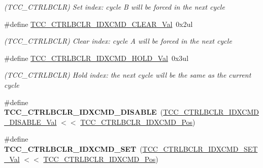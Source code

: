 \begin{DoxyCompactItemize}
\begin{DoxyCompactList}\small\item\em (T\+C\+C\+\_\+\+C\+T\+R\+L\+B\+C\+L\+R) Set index\+: cycle B will be forced in the next cycle \end{DoxyCompactList}\item 
\hypertarget{group___s_a_m_l21___t_c_c_ga330fda675ed566f5e7ccca52c33df413}{}\#define \hyperlink{group___s_a_m_l21___t_c_c_ga330fda675ed566f5e7ccca52c33df413}{T\+C\+C\+\_\+\+C\+T\+R\+L\+B\+C\+L\+R\+\_\+\+I\+D\+X\+C\+M\+D\+\_\+\+C\+L\+E\+A\+R\+\_\+\+Val}~0x2ul\label{group___s_a_m_l21___t_c_c_ga330fda675ed566f5e7ccca52c33df413}

\begin{DoxyCompactList}\small\item\em (T\+C\+C\+\_\+\+C\+T\+R\+L\+B\+C\+L\+R) Clear index\+: cycle A will be forced in the next cycle \end{DoxyCompactList}\item 
\hypertarget{group___s_a_m_l21___t_c_c_gad32be7d01dd69980f7da94c6353064f9}{}\#define \hyperlink{group___s_a_m_l21___t_c_c_gad32be7d01dd69980f7da94c6353064f9}{T\+C\+C\+\_\+\+C\+T\+R\+L\+B\+C\+L\+R\+\_\+\+I\+D\+X\+C\+M\+D\+\_\+\+H\+O\+L\+D\+\_\+\+Val}~0x3ul\label{group___s_a_m_l21___t_c_c_gad32be7d01dd69980f7da94c6353064f9}

\begin{DoxyCompactList}\small\item\em (T\+C\+C\+\_\+\+C\+T\+R\+L\+B\+C\+L\+R) Hold index\+: the next cycle will be the same as the current cycle \end{DoxyCompactList}\item 
\hypertarget{group___s_a_m_l21___t_c_c_ga1a57187ec3837c1c7ab2eb633a34a14e}{}\#define {\bfseries T\+C\+C\+\_\+\+C\+T\+R\+L\+B\+C\+L\+R\+\_\+\+I\+D\+X\+C\+M\+D\+\_\+\+D\+I\+S\+A\+B\+L\+E}~(\hyperlink{group___s_a_m_l21___t_c_c_ga4c9b8c8579bc22e765c00e030f6e6b66}{T\+C\+C\+\_\+\+C\+T\+R\+L\+B\+C\+L\+R\+\_\+\+I\+D\+X\+C\+M\+D\+\_\+\+D\+I\+S\+A\+B\+L\+E\+\_\+\+Val} $<$$<$ \hyperlink{group___s_a_m_l21___t_c_c_gabddca25dc97286079867b1f3714bb494}{T\+C\+C\+\_\+\+C\+T\+R\+L\+B\+C\+L\+R\+\_\+\+I\+D\+X\+C\+M\+D\+\_\+\+Pos})\label{group___s_a_m_l21___t_c_c_ga1a57187ec3837c1c7ab2eb633a34a14e}

\item 
\hypertarget{group___s_a_m_l21___t_c_c_gaf713e3732abba21593df768d716f9497}{}\#define {\bfseries T\+C\+C\+\_\+\+C\+T\+R\+L\+B\+C\+L\+R\+\_\+\+I\+D\+X\+C\+M\+D\+\_\+\+S\+E\+T}~(\hyperlink{group___s_a_m_l21___t_c_c_ga824d45cd52b2067884713412f9cc95ef}{T\+C\+C\+\_\+\+C\+T\+R\+L\+B\+C\+L\+R\+\_\+\+I\+D\+X\+C\+M\+D\+\_\+\+S\+E\+T\+\_\+\+Val}   $<$$<$ \hyperlink{group___s_a_m_l21___t_c_c_gabddca25dc97286079867b1f3714bb494}{T\+C\+C\+\_\+\+C\+T\+R\+L\+B\+C\+L\+R\+\_\+\+I\+D\+X\+C\+M\+D\+\_\+\+Pos})\label{group___s_a_m_l21___t_c_c_gaf713e3732abba21593df768d716f9497}


\end{DoxyCompactItemize}
